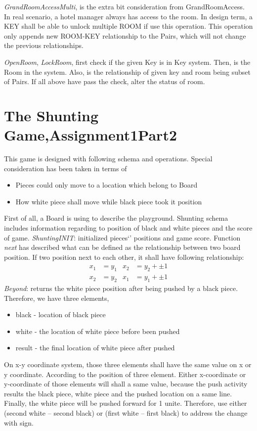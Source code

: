 \textit{GrandRoomAccessMulti}, is the extra bit consideration from GrandRoomAccess. In real scenario, a hotel manager always has access to the room. In design term, a KEY shall be able to unlock multiple ROOM if use this operation. This operation only appends new ROOM-KEY relationship to the Pairs, which will not change the previous relationships.

\textit{OpenRoom}, \textit{LockRoom}, first check if the given Key is in Key system. Then, is the Room in the system. Also, is the relationship of given key and room being subset of Pairs. If all above have pass the check, alter the status of room. 

\section{The Shunting Game,Assignment1Part2}
This game is designed with following schema and operations. 
Special consideration has been taken in terms of \begin{itemize}
    \item Pieces could only move to a location which belong to Board
    \item How white piece shall move while black piece took it position
\end{itemize}
First of all, a Board is using to describe the playground. 
Shunting schema includes information regarding to position of black and white pieces and the score of game. 
\textit{ShuntingINIT}: initialized pieces\char`' positions and game score.
Function \textit{next} has described what can be defined as the relationship between two board position. If two position next to each other, it shall have following relationship:
\begin{align*}
x_1 &= y_1  &   x_2 &= y_2 + \pm1  \\
x_2 &= y_2  &   x_1 &= y_1+ \pm1
\end{align*}
\textit{Beyond}: returns the white piece position after being pushed by a black piece.
Therefore, we have three elements,
\begin{itemize}
    \item 	black - location of black piece
    \item 	white - the location of white piece before been pushed 
    \item 	result - the final location of white piece after pushed 
\end{itemize}

On x-y coordinate system, those three elements shall have the same value on x or y coordinate. According to the position of three element. Either x-coordinate or y-coordinate of those elements will shall a same value, because the push activity results the black piece, white piece and the pushed location on a same line. Finally, the white piece will be pushed forward for 1 unite. Therefore, use either (second white – second black) or (first white – first black) to address the change with \pm sign. 

